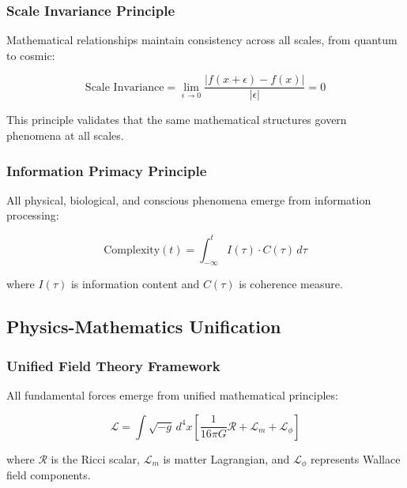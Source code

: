 \subsubsection{Scale Invariance Principle}

\begin{theorem}
Mathematical relationships maintain consistency across all scales, from quantum to cosmic:

\begin{equation}
\text{Scale Invariance} = \lim_{\epsilon \to 0} \frac{|f(x + \epsilon) - f(x)|}{|\epsilon|} = 0
\end{equation}

This principle validates that the same mathematical structures govern phenomena at all scales.
\end{theorem}

\subsubsection{Information Primacy Principle}

\begin{theorem}
All physical, biological, and conscious phenomena emerge from information processing:

\begin{equation}
\text{Complexity}(t) = \int_{-\infty}^{t} I(\tau) \cdot C(\tau) \, d\tau
\end{equation}

where $I(\tau)$ is information content and $C(\tau)$ is coherence measure.
\end{theorem}

\subsection{Physics-Mathematics Unification}

\subsubsection{Unified Field Theory Framework}

\begin{theorem}
All fundamental forces emerge from unified mathematical principles:

\begin{equation}
\mathcal{L} = \int \sqrt{-g} \, d^4x \left[ \frac{1}{16\pi G} \mathcal{R} + \mathcal{L}_m + \mathcal{L}_\phi \right]
\end{equation}

where $\mathcal{R}$ is the Ricci scalar, $\mathcal{L}_m$ is matter Lagrangian, and $\mathcal{L}_\phi$ represents Wallace field components.
\end{theorem}

